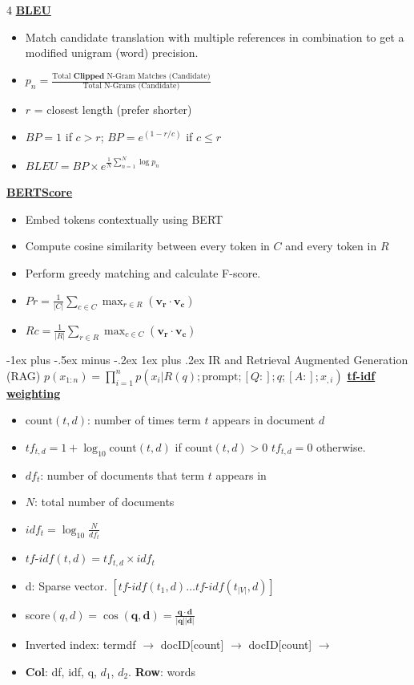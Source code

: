 \documentclass[10pt, landscape]{article}
\makeatletter
\renewcommand{\subsubsection}{\@startsection{subsubsection}{3}{0mm}%
  {-1ex plus -.5ex minus -.2ex}%
  {1ex plus .2ex}%
{\normalfont\small\bfseries}}%
\makeatother
\begin{document}
\begin{multicols*}{4}
  \underline{\textbf{BLEU}}
  \begin{itemize}
    \item Match candidate translation with multiple references in combination to get a modified unigram (word) precision.
    \item $p_n = \frac{\text{Total } \textbf{Clipped } \text{N-Gram Matches (Candidate)}}{\text{Total N-Grams (Candidate)}}$
    \item $r$ = closest length (prefer shorter)
    \item $BP = 1$ if $c > r$; $BP = e^{(1-r/c)}$ if $c \leq r$ 
    \item $BLEU = BP \times e^{ \frac{1}{N} \sum_{n=1}^{N} \log p_n}$
  \end{itemize}

  \underline{\textbf{BERTScore}}
  \begin{itemize}
    \item Embed tokens contextually using BERT 
    \item Compute cosine similarity between every token in $C$ and every token in $R$
    \item Perform greedy matching and calculate F-score.
    \item $Pr = \frac{1}{|C|} \sum_{c \in C} \max_{r \in R} (\mathbf{v_r \cdot v_c})$
    \item $Rc = \frac{1}{|R|} \sum_{r \in R} \max_{c \in C} (\mathbf{v_r \cdot v_c})$
  \end{itemize}

  \subsubsection{IR and Retrieval Augmented Generation (RAG)}
  $p(x_{1:n}) = \prod_{i=1}^{n} p(x_i | R(q); \text{prompt};[Q:];q;[A:];x_{,i})$
  \underline{\textbf{tf-idf weighting}}
  \begin{itemize}
    \item $\text{count}(t,d)$: number of times term $t$ appears in document $d$
    \item $tf_{t,d} = 1 + \log_{10} \text{count}(t,d) $ if $\text{count}(t,d) > 0$ \newline $tf_{t,d} = 0$ otherwise.
    \item $df_t$: number of documents that term $t$ appears in
    \item $N$: total number of documents 
    \item $idf_t = \log_{10} \frac{N}{df_t}$
    \item $tf\text{-}idf(t,d) = tf_{t,d} \times idf_t$
    \item d: Sparse vector. $[tf\text{-}idf(t_1,d) \dots tf\text{-}idf(t_{|V|},d)]$
    \item score$(q,d) = \cos(\mathbf{q,d}) = \frac{\mathbf{q \cdot d}}{\mathbf{|q||d|}}$
    \item Inverted index: term{df} $\rightarrow$ docID[count] $\rightarrow$ docID[count] $\rightarrow$ 
    \item \textbf{Col}: df, idf, q, $d_1$, $d_2$. \textbf{Row}: words
  \end{itemize}


\end{multicols*}
\end{document}
